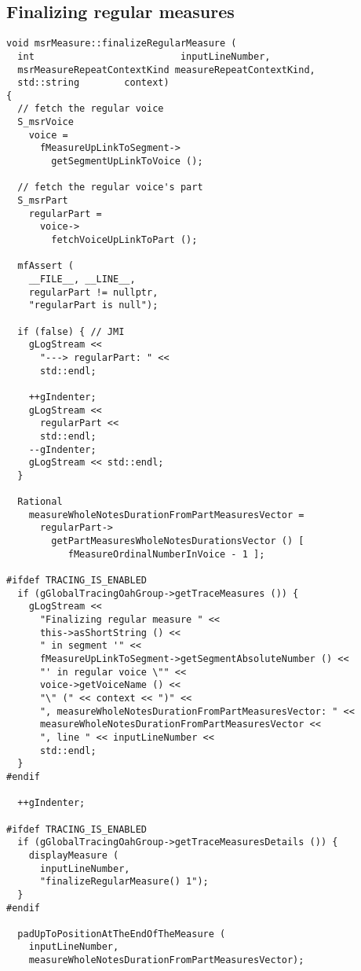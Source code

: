 \subsection{Finalizing regular measures}

\begin{lstlisting}[language=CPlusPlus]
void msrMeasure::finalizeRegularMeasure (
  int                          inputLineNumber,
  msrMeasureRepeatContextKind measureRepeatContextKind,
  std::string        context)
{
  // fetch the regular voice
  S_msrVoice
    voice =
      fMeasureUpLinkToSegment->
        getSegmentUpLinkToVoice ();

  // fetch the regular voice's part
  S_msrPart
    regularPart =
      voice->
        fetchVoiceUpLinkToPart ();

  mfAssert (
    __FILE__, __LINE__,
    regularPart != nullptr,
    "regularPart is null");

  if (false) { // JMI
    gLogStream <<
      "---> regularPart: " <<
      std::endl;

    ++gIndenter;
    gLogStream <<
      regularPart <<
      std::endl;
    --gIndenter;
    gLogStream << std::endl;
  }

  Rational
    measureWholeNotesDurationFromPartMeasuresVector =
      regularPart->
        getPartMeasuresWholeNotesDurationsVector () [
           fMeasureOrdinalNumberInVoice - 1 ];

#ifdef TRACING_IS_ENABLED
  if (gGlobalTracingOahGroup->getTraceMeasures ()) {
    gLogStream <<
      "Finalizing regular measure " <<
      this->asShortString () <<
      " in segment '" <<
      fMeasureUpLinkToSegment->getSegmentAbsoluteNumber () <<
      "' in regular voice \"" <<
      voice->getVoiceName () <<
      "\" (" << context << ")" <<
      ", measureWholeNotesDurationFromPartMeasuresVector: " <<
      measureWholeNotesDurationFromPartMeasuresVector <<
      ", line " << inputLineNumber <<
      std::endl;
  }
#endif

  ++gIndenter;

#ifdef TRACING_IS_ENABLED
  if (gGlobalTracingOahGroup->getTraceMeasuresDetails ()) {
    displayMeasure (
      inputLineNumber,
      "finalizeRegularMeasure() 1");
  }
#endif

  padUpToPositionAtTheEndOfTheMeasure (
    inputLineNumber,
    measureWholeNotesDurationFromPartMeasuresVector);


\end{lstlisting}
